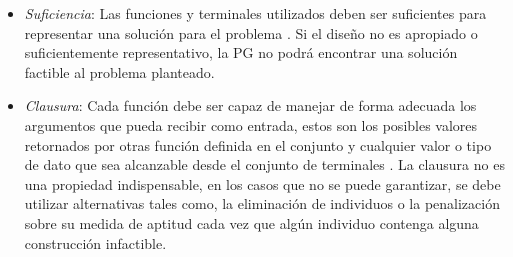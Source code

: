 \begin{itemize}


\item \textit{Suficiencia}: Las funciones y terminales utilizados deben ser suficientes para representar una solución para el problema \citep{koza_1992}. Si el diseño no es apropiado o suficientemente representativo, la PG no podrá encontrar una solución factible al problema planteado.

\item \textit{Clausura}: Cada función debe ser capaz de manejar de forma adecuada los argumentos que pueda recibir como entrada, estos son los posibles valores retornados por otras función definida en el conjunto y cualquier valor o tipo de dato que sea alcanzable desde el conjunto de terminales \citep{koza_1992}. La clausura no es una propiedad indispensable, en los casos que no se puede garantizar, se debe utilizar alternativas tales como, la eliminación de individuos o la penalización sobre su medida de aptitud cada vez que algún individuo contenga alguna construcción infactible.






\end{itemize}


